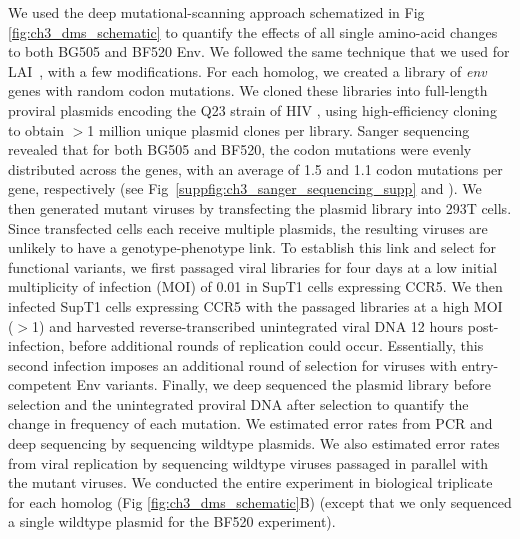 \documentclass[9pt]{elife}
\begin{document}
We used the deep mutational-scanning approach schematized in Fig \ref{fig:ch3_dms_schematic} to quantify the effects of all single amino-acid changes to both BG505 and BF520 Env.
We followed the same technique that we used for LAI~\cite{haddox2016experimental}, with a few modifications.
For each homolog, we created a library of \textit{env} genes with random codon mutations.
We cloned these libraries into full-length proviral plasmids encoding the Q23 strain of HIV \cite{poss1999variants}, using high-efficiency cloning to obtain $>$1 million unique plasmid clones per library.
Sanger sequencing revealed that for both BG505 and BF520, the codon mutations were evenly distributed across the genes, with an average of 1.5 and 1.1 codon mutations per gene, respectively (see Fig~\ref{suppfig:ch3_sanger_sequencing_supp} and \cite{dingens2017comprehensive}).
We then generated mutant viruses by transfecting the plasmid library into 293T cells.
Since transfected cells each receive multiple plasmids, the resulting viruses are unlikely to have a genotype-phenotype link.
To establish this link and select for functional variants, we first passaged viral libraries for four days at a low initial multiplicity of infection (MOI) of 0.01 in SupT1 cells expressing CCR5.
We then infected SupT1 cells expressing CCR5 with the passaged libraries at a high MOI ($>$1) and harvested reverse-transcribed unintegrated viral DNA 12 hours post-infection, before additional rounds of replication could occur.
Essentially, this second infection imposes an additional round of selection for viruses with entry-competent Env variants.
Finally, we deep sequenced the plasmid library before selection and the unintegrated proviral DNA after selection to quantify the change in frequency of each mutation.
We estimated error rates from PCR and deep sequencing by sequencing wildtype plasmids.
We also estimated error rates from viral replication by sequencing wildtype viruses passaged in parallel with the mutant viruses.
We conducted the entire experiment in biological triplicate for each homolog (Fig \ref{fig:ch3_dms_schematic}B) (except that we only sequenced a single wildtype plasmid for the BF520 experiment).
\end{document}
